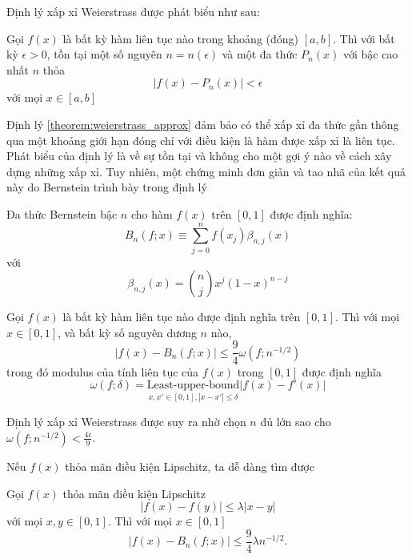 Định lý xấp xỉ Weierstrass được phát biểu như sau:
\begin{theorem}
    \label{theorem:weierstrass_approx}
    Gọi $f(x)$ là bất kỳ hàm liên tục nào trong khoảng (đóng) $[a, b]$. Thì với bất kỳ $\epsilon > 0$, tồn tại một số nguyên $n = n(\epsilon)$ và một đa thức $P_n(x)$ với bậc cao nhất $n$ thỏa
    \begin{equation}
        \left | f(x) - P_n(x)\right | < \epsilon
    \end{equation}
    với mọi $x \in [a, b]$
\end{theorem}

Định lý \ref{theorem:weierstrass_approx} đảm bảo có thể xấp xỉ đa thức gần thông qua một khoảng giới hạn đóng chỉ với điều kiện là hàm được xấp xỉ là liên tục. Phát biểu của định lý là về sự tồn tại và không cho một gợi ý nào về cách xây dựng những xấp xỉ. Tuy nhiên, một chứng minh đơn giản và tao nhã của kết quả này do Bernstein trình bày trong định lý

Đa thức Bernstein bậc $n$ cho hàm $f(x)$ trên $[0, 1]$ được định nghĩa:
\begin{equation}
    B_n(f; x) \equiv \sum_{j = 0}^nf(x_j)\beta_{n, j}(x)
\end{equation}
với 
\begin{equation}
    \beta_{n, j}(x) = \binom{n}{j}x^j(1-x)^{n-j}
\end{equation}
\begin{theorem}
    Gọi $f(x)$ là bất kỳ hàm liên tục nào được định nghĩa trên $[0, 1]$. Thì với mọi $x \in [0, 1]$, và bất kỳ số nguyên dương $n$ nào,
    \begin{equation}
        \left | f(x) - B_n(f; x)\right | \leq \frac{9}{4}\omega(f;n^{-1/2})
    \end{equation}
    trong đó modulus của tính liên tục của $f(x)$ trong $[0, 1]$ được định nghĩa
    \begin{equation}
        \omega(f; \delta) = \underset{x, x' \in [0, 1], \left | x - x'\right | \leq \delta}{\text{Least-upper-bound}}\left | f(x) - f'(x)\right |
    \end{equation}
\end{theorem}
Định lý xấp xỉ Weierstrass được suy ra nhờ chọn $n$ đủ lớn sao cho $\omega(f;n^{-1/2}) < \frac{4\epsilon}{9}$.

Nếu $f(x)$ thỏa mãn điều kiện Lipschitz, ta dễ dàng tìm được
\begin{coro}
    Gọi $f(x)$ thỏa mãn điều kiện Lipschitz
    \begin{equation}
        \left | f(x) - f(y)\right | \leq \lambda\left | x-y\right |
    \end{equation}
    với mọi $x, y \in [0, 1]$. Thì với mọi $x\in [0, 1]$
    \begin{equation}
        \left | f(x) - B_n(f; x)\right | \leq  \frac{9}{4}\lambda n^{-1/2}.
    \end{equation}
\end{coro}

